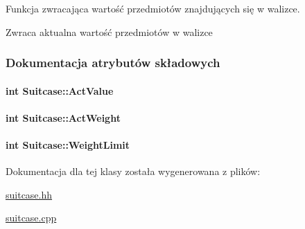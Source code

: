Funkcja zwracająca wartość przedmiotów znajdujących się w walizce. 

\begin{DoxyReturn}{Zwraca}
aktualna wartość przedmiotów w walizce 
\end{DoxyReturn}


\subsubsection{Dokumentacja atrybutów składowych}
\hypertarget{class_suitcase_a38f65d031935c37d82b9813d83accadd}{
\paragraph[{Act\-Value}]{\setlength{\rightskip}{0pt plus 5cm}int Suitcase\-::\-Act\-Value\hspace{0.3cm}{\ttfamily [private]}}}\label{class_suitcase_a38f65d031935c37d82b9813d83accadd}
\hypertarget{class_suitcase_a67dfe88f590b9985b436a813596f22e6}{
\paragraph[{Act\-Weight}]{\setlength{\rightskip}{0pt plus 5cm}int Suitcase\-::\-Act\-Weight\hspace{0.3cm}{\ttfamily [private]}}}\label{class_suitcase_a67dfe88f590b9985b436a813596f22e6}
\hypertarget{class_suitcase_a7bc04635b9636279709ad3ff1f2281bd}{
\paragraph[{Weight\-Limit}]{\setlength{\rightskip}{0pt plus 5cm}int Suitcase\-::\-Weight\-Limit\hspace{0.3cm}{\ttfamily [private]}}}\label{class_suitcase_a7bc04635b9636279709ad3ff1f2281bd}


Dokumentacja dla tej klasy została wygenerowana z plików\-:\begin{DoxyCompactItemize}
\item 
\hyperlink{suitcase_8hh}{suitcase.\-hh}\item 
\hyperlink{suitcase_8cpp}{suitcase.\-cpp}\end{DoxyCompactItemize}
